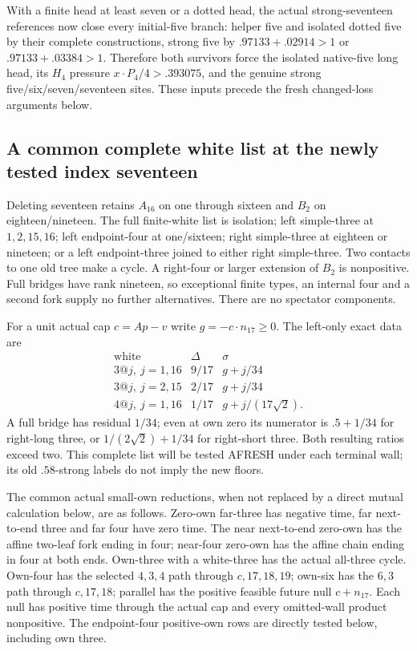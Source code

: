 With a finite head at least seven
or a dotted head, the actual
strong-seventeen references now
close every initial-five branch:
helper five and isolated dotted
five by their complete constructions,
strong five by
\(.97133+.02914>1\) or
\(.97133+.03384>1\).
Therefore both survivors force
the isolated native-five long head,
its \(H_4\) pressure
\(x\cdot P_4/4>.393075\),
and the genuine strong
five/six/seven/seventeen sites.
These inputs precede the fresh
changed-loss arguments below.


\subsection{A common complete white list at the newly tested index seventeen}
\label{app:exact19:Bchangedlist}

Deleting seventeen retains \(A_{16}\)
on one through sixteen and \(B_2\)
on eighteen/nineteen.
The full finite-white list is
isolation; left simple-three at
\(1,2,15,16\); left endpoint-four
at one/sixteen; right simple-three
at eighteen or nineteen; or a
left endpoint-three joined to
either right simple-three.
Two contacts to one old tree
make a cycle.
A right-four or larger extension
of \(B_2\) is nonpositive.
Full bridges have rank nineteen,
so exceptional finite types,
an internal four and a second
fork supply no further alternatives.
There are no spectator components.

For a unit actual cap \(c=Ap-v\)
write \(g=-c\cdot n_{17}\ge0\).
The left-only exact data are
\[
\begin{array}{c|c|c}
 \text{white}&\Delta&\sigma\\ \hline
 3@j,\ j=1,16&9/17&g+j/34\\
 3@j,\ j=2,15&2/17&g+j/34\\
 4@j,\ j=1,16&1/17&g+j/(17\sqrt2).
\end{array}
\]
A full bridge has residual \(1/34\);
even at own zero its numerator
is \(.5+1/34\) for right-long
three, or \(1/(2\sqrt2)+1/34\)
for right-short three.
Both resulting ratios exceed two.
This complete list will be tested
AFRESH under each terminal wall;
its old \(.58\)-strong labels
do not imply the new floors.

The common actual small-own
reductions, when not replaced by
a direct mutual calculation below,
are as follows.
Zero-own far-three has negative
time, far next-to-end three and
far four have zero time.
The near next-to-end zero-own
has the affine two-leaf fork
ending in four; near-four
zero-own has the affine chain
ending in four at both ends.
Own-three with a white-three
has the actual all-three cycle.
Own-four has the selected
\(4,3,4\) path through
\(c,17,18,19\); own-six has the
\(6,3\) path through \(c,17,18\);
parallel has the positive feasible
future null \(c+n_{17}\).
Each null has positive time
through the actual cap and every
omitted-wall product nonpositive.
The endpoint-four positive-own
rows are directly tested below,
including own three.

